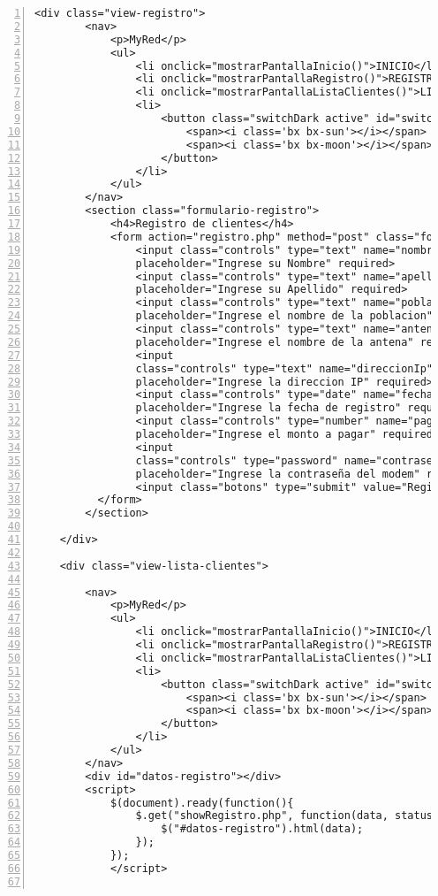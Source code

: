 \begin{lstlisting}[basicstyle=\footnotesize\ttfamily, numbers=left]
    <div class="view-registro">
        <nav>
            <p>MyRed</p>
            <ul>
                <li onclick="mostrarPantallaInicio()">INICIO</li>
                <li onclick="mostrarPantallaRegistro()">REGISTRO</li>
                <li onclick="mostrarPantallaListaClientes()">LISTA DE CLIENTES</li>
                <li>
                    <button class="switchDark active" id="switch">
                        <span><i class='bx bx-sun'></i></span>
                        <span><i class='bx bx-moon'></i></span>
                    </button>
                </li>
            </ul>
        </nav>
        <section class="formulario-registro">
            <h4>Registro de clientes</h4>
            <form action="registro.php" method="post" class="formulario-registro">
                <input class="controls" type="text" name="nombres" id="nombres" 
                placeholder="Ingrese su Nombre" required>
                <input class="controls" type="text" name="apellidos" id="apellidos" 
                placeholder="Ingrese su Apellido" required>
                <input class="controls" type="text" name="poblacion" id="poblacion" 
                placeholder="Ingrese el nombre de la poblacion" required>
                <input class="controls" type="text" name="antena" id="antena" 
                placeholder="Ingrese el nombre de la antena" required>
                <input 
                class="controls" type="text" name="direccionIp" id="direccionIp" 
                placeholder="Ingrese la direccion IP" required>
                <input class="controls" type="date" name="fecha" id="fecha" 
                placeholder="Ingrese la fecha de registro" required>
                <input class="controls" type="number" name="pago" id="pago" 
                placeholder="Ingrese el monto a pagar" required>
                <input 
                class="controls" type="password" name="contraseña" id="contraseña" 
                placeholder="Ingrese la contraseña del modem" required>
                <input class="botons" type="submit" value="Registrar">
          </form>
        </section>

    </div>

    <div class="view-lista-clientes">
        
        <nav>
            <p>MyRed</p>
            <ul>
                <li onclick="mostrarPantallaInicio()">INICIO</li>
                <li onclick="mostrarPantallaRegistro()">REGISTRO</li>
                <li onclick="mostrarPantallaListaClientes()">LISTA DE CLIENTES</li>
                <li>
                    <button class="switchDark active" id="switch">
                        <span><i class='bx bx-sun'></i></span>
                        <span><i class='bx bx-moon'></i></span>
                    </button>
                </li>
            </ul>
        </nav>
        <div id="datos-registro"></div>
        <script>
            $(document).ready(function(){
                $.get("showRegistro.php", function(data, status){
                    $("#datos-registro").html(data);
                });
            });
            </script>
        

\end{lstlisting}
